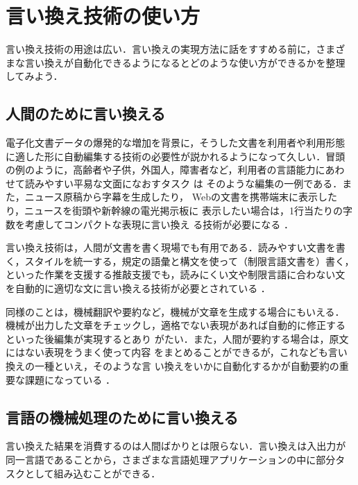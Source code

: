\section{言い換え技術の使い方}
\label{sec:applications}

言い換え技術の用途は広い．言い換えの実現方法に話をすすめる前に，さまざ
まな言い換えが自動化できるようになるとどのような使い方ができるかを整理
してみよう．

\subsection{人間のために言い換える}

電子化文書データの爆発的な増加を背景に，そうした文書を利用者や利用形態
に適した形に自動編集する技術の必要性が説かれるようになって久しい．冒頭
の例のように，高齢者や子供，外国人，障害者など，利用者の言語能力にあわ
せて読みやすい平易な文面になおすタスク
\cite{carroll:98:a,canning:99:a,inui:01:a,higashinaka:02,inui:03:a}は
そのような編集の一例である．また，ニュース原稿から字幕を生成したり，
Webの文書を携帯端末に表示したり，ニュースを街頭や新幹線の電光掲示板に
表示したい場合は，1行当たりの字数を考慮してコンパクトな表現に言い換え
る技術が必要になる
\cite{robin:96,kondo:97:a,fukushima:99,mikami:99,ehara:00,kataoka:00,masuda:01:a,SatoDai:04:a,ikeda:04}．

言い換え技術は，人間が文書を書く現場でも有用である．読みやすい文書を書
く，スタイルを統一する，規定の語彙と構文を使って（制限言語文書を）書く，
といった作業を支援する推敲支援でも，読みにくい文や制限言語に合わない文
を自動的に適切な文に言い換える技術が必要とされている
\cite{hayashi:91,takahashi:91:a,takeishi:92,dras:99:a,mitamura:01}．

同様のことは，機械翻訳や要約など，機械が文章を生成する場合にもいえる．
機械が出力した文章をチェックし，適格でない表現があれば自動的に修正する
といった後編集\cite{knight:94:a,mani:99:a,nanba:00:a}が実現するとあり
がたい．また，人間が要約する場合は，原文にはない表現をうまく使って内容
をまとめることができるが，これなども言い換えの一種といえ，そのような言
い換えをいかに自動化するかが自動要約の重要な課題になっている
\cite{kondo:97:a,okumura:99:a,kataoka:00,okumura:02:a}．

\subsection{言語の機械処理のために言い換える}
\label{ssec:for_machine}

言い換えた結果を消費するのは人間ばかりとは限らない．言い換えは入出力が
同一言語であることから，さまざまな言語処理アプリケーションの中に部分タ
スクとして組み込むことができる．

